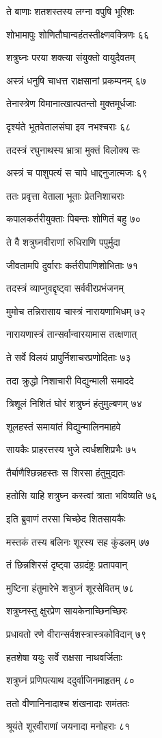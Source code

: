 ते बाणाः शतशस्तस्य लग्ना वपुषि भूरिशः

शोभामापुः शोणितौघान्वहंतस्तीक्ष्णवक्त्रिणः ६६

शत्रुघ्नः परया शक्त्या संयुक्तो वायुदैवतम्

अस्त्रं धनुषि चाधत्त राक्षसानां प्रकम्पनम् ६७

तेनास्त्रेण विमानात्खात्पतन्तो मुक्तमूर्धजाः

दृश्यंते भूतवेतालसंघा इव नभश्चराः ६८

तदस्त्रं रघुनाथस्य भ्रात्रा मुक्तं विलोक्य सः

अस्त्रं च पाशुपत्यं स चापे धाद्दनुजात्मजः ६९

ततः प्रवृत्ता वेताला भूताः प्रेतनिशाचराः

कपालकर्तरीयुक्ताः पिबन्तः शोणितं बहु ७०

ते वै शत्रुघ्नवीराणां रुधिराणि पपुर्मुदा

जीवतामपि दुर्वाराः कर्तरीपाणिशोभिताः ७१

तदस्त्रं व्याप्नुवद्दृष्ट्वा सर्ववीरप्रभंजनम्

मुमोच तन्निरासाय चास्त्रं नारायणाभिधम् ७२

नारायणास्त्रं तान्सर्वान्वारयामास तत्क्षणात्

ते सर्वे विलयं प्रापुर्निशाचरप्रणोदिताः ७३

तदा क्रुद्धो निशाचारी विद्युन्माली समाददे

त्रिशूलं निशितं घोरं शत्रुघ्नं हंतुमुल्बणम् ७४

शूलहस्तं समायांतं विद्युन्मालिनमाहवे

सायकैः प्राहरत्तस्य भुजे त्वर्धशशिप्रभैः ७५

तैर्बाणैश्छिन्नहस्तः स शिरसा हंतुमुद्यतः

हतोसि याहि शत्रुघ्न कस्त्वां त्राता भविष्यति ७६

इति ब्रुवाणं तरसा चिच्छेद शितसायकैः

मस्तकं तस्य बलिनः शूरस्य सह कुंडलम् ७७

तं छिन्नशिरसं दृष्ट्वा उग्रदंष्ट्रः प्रतापवान्

मुष्टिना हंतुमारेभे शत्रुघ्नं शूरसेवितम् ७८

शत्रुघ्नस्तु क्षुरप्रेण सायकेनाच्छिनच्छिरः

प्रधावतो रणे वीरान्सर्वशस्त्रास्त्रकोविदान् ७९

हतशेषा ययुः सर्वे राक्षसा नाथवर्जिताः

शत्रुघ्नं प्रणिपत्याथ ददुर्वाजिनमाहृतम् ८०

ततो वीणानिनादाश्च शंखनादाः समंततः

श्रूयंते शूरवीराणां जयनादा मनोहराः ८१


